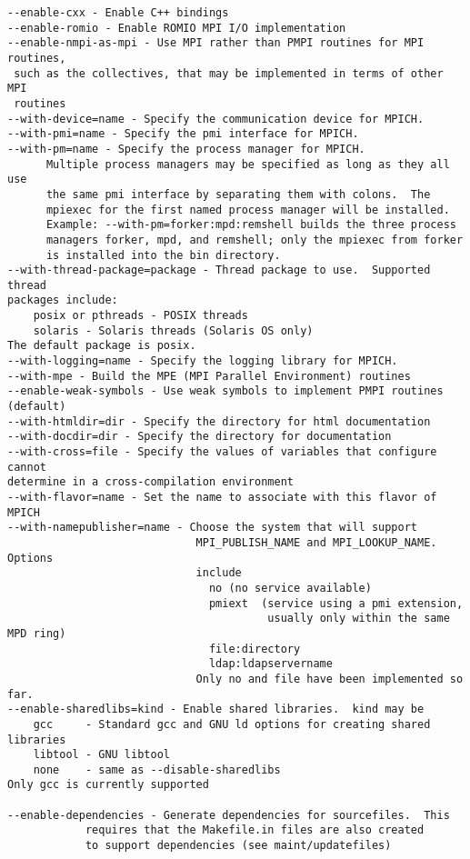 \documentclass[dvipdfm,11pt]{article}
\begin{document}
\begin{verbatim}
--enable-cxx - Enable C++ bindings
--enable-romio - Enable ROMIO MPI I/O implementation
--enable-nmpi-as-mpi - Use MPI rather than PMPI routines for MPI routines,
 such as the collectives, that may be implemented in terms of other MPI 
 routines
--with-device=name - Specify the communication device for MPICH.
--with-pmi=name - Specify the pmi interface for MPICH.
--with-pm=name - Specify the process manager for MPICH.
      Multiple process managers may be specified as long as they all use
      the same pmi interface by separating them with colons.  The 
      mpiexec for the first named process manager will be installed.
      Example: --with-pm=forker:mpd:remshell builds the three process 
      managers forker, mpd, and remshell; only the mpiexec from forker
      is installed into the bin directory.
--with-thread-package=package - Thread package to use.  Supported thread
packages include:
    posix or pthreads - POSIX threads
    solaris - Solaris threads (Solaris OS only)
The default package is posix.
--with-logging=name - Specify the logging library for MPICH.
--with-mpe - Build the MPE (MPI Parallel Environment) routines
--enable-weak-symbols - Use weak symbols to implement PMPI routines (default)
--with-htmldir=dir - Specify the directory for html documentation
--with-docdir=dir - Specify the directory for documentation
--with-cross=file - Specify the values of variables that configure cannot
determine in a cross-compilation environment
--with-flavor=name - Set the name to associate with this flavor of MPICH
--with-namepublisher=name - Choose the system that will support 
                             MPI_PUBLISH_NAME and MPI_LOOKUP_NAME.  Options
                             include
                               no (no service available)
                               pmiext  (service using a pmi extension,
                                        usually only within the same MPD ring)
                               file:directory
                               ldap:ldapservername
                             Only no and file have been implemented so far.
--enable-sharedlibs=kind - Enable shared libraries.  kind may be
    gcc     - Standard gcc and GNU ld options for creating shared libraries
    libtool - GNU libtool 
    none    - same as --disable-sharedlibs
Only gcc is currently supported

--enable-dependencies - Generate dependencies for sourcefiles.  This
            requires that the Makefile.in files are also created
            to support dependencies (see maint/updatefiles)
\end{verbatim}
\end{document}
